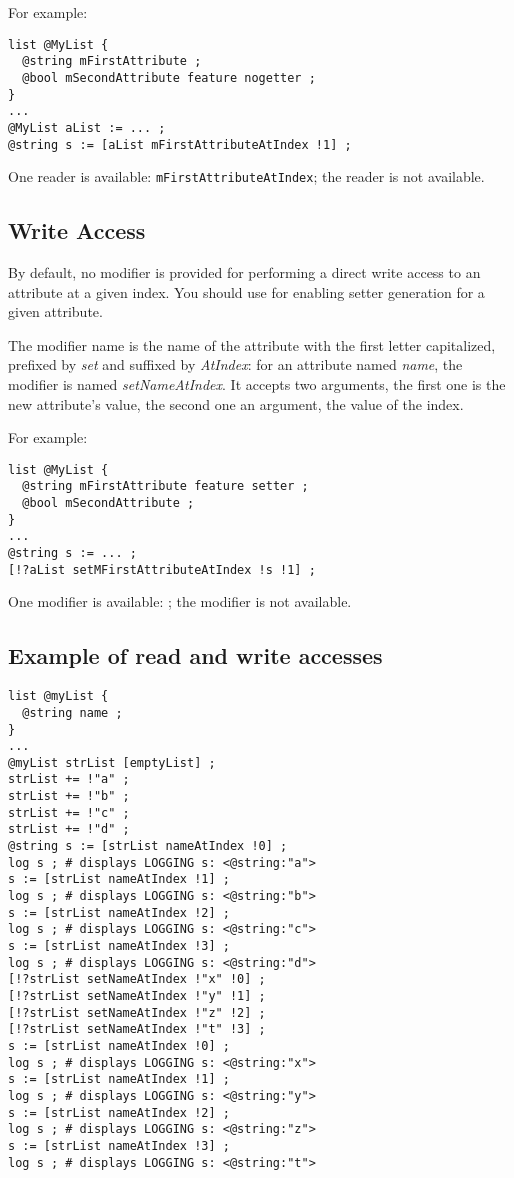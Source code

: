 For example:
\begin{lstlisting}[language=galgas]
list @MyList {
  @string mFirstAttribute ;
  @bool mSecondAttribute feature nogetter ;
}
...
@MyList aList := ... ;
@string s := [aList mFirstAttributeAtIndex !1] ;
\end{lstlisting}

One reader is available: \lstinline[language=galgas]!mFirstAttributeAtIndex!; the  reader is not available.


\subsection{Write Access}

By default, no modifier is provided for performing a direct write access to an attribute at a given index. You should use  for enabling setter generation for a given attribute.

The modifier name is the name of the attribute with the first letter capitalized, prefixed by \emph{set} and suffixed by \emph{AtIndex}: for an attribute named \emph{name}, the modifier is named \emph{setNameAtIndex}. It accepts two arguments, the first one is the new attribute's value, the second one an  argument, the value of the index.

For example:

\begin{lstlisting}[language=galgas]
list @MyList {
  @string mFirstAttribute feature setter ;
  @bool mSecondAttribute ;
}
...
@string s := ... ;
[!?aList setMFirstAttributeAtIndex !s !1] ;
\end{lstlisting}

One modifier is available: ; the  modifier is not available.

\subsection{Example of read and write accesses}

\begin{lstlisting}[language=galgas]
list @myList {
  @string name ;
}
...
@myList strList [emptyList] ;
strList += !"a" ;
strList += !"b" ;
strList += !"c" ;
strList += !"d" ;
@string s := [strList nameAtIndex !0] ;
log s ; # displays LOGGING s: <@string:"a">
s := [strList nameAtIndex !1] ;
log s ; # displays LOGGING s: <@string:"b">
s := [strList nameAtIndex !2] ;
log s ; # displays LOGGING s: <@string:"c">
s := [strList nameAtIndex !3] ;
log s ; # displays LOGGING s: <@string:"d">
[!?strList setNameAtIndex !"x" !0] ;
[!?strList setNameAtIndex !"y" !1] ;
[!?strList setNameAtIndex !"z" !2] ;
[!?strList setNameAtIndex !"t" !3] ;
s := [strList nameAtIndex !0] ;
log s ; # displays LOGGING s: <@string:"x">
s := [strList nameAtIndex !1] ;
log s ; # displays LOGGING s: <@string:"y">
s := [strList nameAtIndex !2] ;
log s ; # displays LOGGING s: <@string:"z">
s := [strList nameAtIndex !3] ;
log s ; # displays LOGGING s: <@string:"t">
\end{lstlisting}
